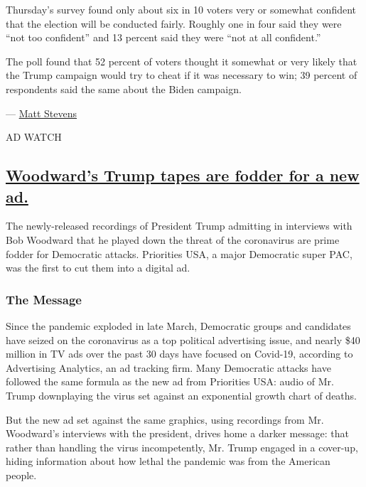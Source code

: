 Thursday's survey found only about six in 10 voters very or somewhat
confident that the election will be conducted fairly. Roughly one in
four said they were ``not too confident'' and 13 percent said they were
``not at all confident.''

The poll found that 52 percent of voters thought it somewhat or very
likely that the Trump campaign would try to cheat if it was necessary to
win; 39 percent of respondents said the same about the Biden campaign.

--- \href{https://www.nytimes3xbfgragh.onion/by/matt-stevens}{Matt
Stevens}

AD WATCH

\hypertarget{woodwards-trump-tapes-are-fodder-for-a-new-ad}{%
\subsection{\texorpdfstring{\protect\hyperlink{woodwards-trump-tapes-are-fodder-for-a-new-ad}{Woodward's
Trump tapes are fodder for a new
ad.}}{Woodward's Trump tapes are fodder for a new ad.}}\label{woodwards-trump-tapes-are-fodder-for-a-new-ad}}

The newly-released recordings of President Trump admitting in interviews
with Bob Woodward that he played down the threat of the coronavirus are
prime fodder for Democratic attacks. Priorities USA, a major Democratic
super PAC, was the first to cut them into a digital ad.

\hypertarget{the-message}{%
\subsubsection{The Message}\label{the-message}}

Since the pandemic exploded in late March, Democratic groups and
candidates have seized on the coronavirus as a top political advertising
issue, and nearly \$40 million in TV ads over the past 30 days have
focused on Covid-19, according to Advertising Analytics, an ad tracking
firm. Many Democratic attacks have followed the same formula as the new
ad from Priorities USA: audio of Mr. Trump downplaying the virus set
against an exponential growth chart of deaths.

But the new ad set against the same graphics, using recordings from Mr.
Woodward's interviews with the president, drives home a darker message:
that rather than handling the virus incompetently, Mr. Trump engaged in
a cover-up, hiding information about how lethal the pandemic was from
the American people.

